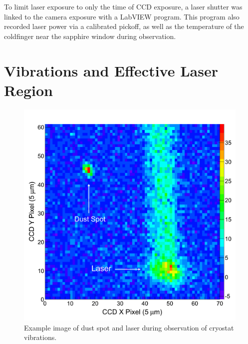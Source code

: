 To limit laser exposure to only the time of CCD exposure, a laser shutter was linked to the camera exposure with a LabVIEW program.  This program also recorded laser power via a calibrated pickoff, as well as the temperature of the coldfinger near the sapphire window during observation.

\section{Vibrations and Effective Laser Region}

\begin{figure} %
        \centering
                \includegraphics[width=.6\textwidth]{figures/image_dustspot.png}
                \caption{Example image of dust spot and laser during observation of cryostat vibrations.}
\label{fig:dustspot}
\end{figure}


